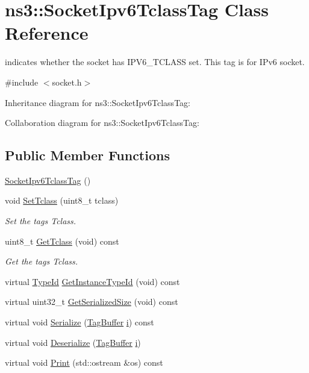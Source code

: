 \hypertarget{classns3_1_1SocketIpv6TclassTag}{}\section{ns3\+:\+:Socket\+Ipv6\+Tclass\+Tag Class Reference}
\label{classns3_1_1SocketIpv6TclassTag}


indicates whether the socket has I\+P\+V6\+\_\+\+T\+C\+L\+A\+SS set. This tag is for I\+Pv6 socket.  




{\ttfamily \#include $<$socket.\+h$>$}



Inheritance diagram for ns3\+:\+:Socket\+Ipv6\+Tclass\+Tag\+:


Collaboration diagram for ns3\+:\+:Socket\+Ipv6\+Tclass\+Tag\+:
\subsection*{Public Member Functions}
\begin{DoxyCompactItemize}
\item 
\hyperlink{classns3_1_1SocketIpv6TclassTag_a9f458d297db00ff2e300641be4d3df49}{Socket\+Ipv6\+Tclass\+Tag} ()
\item 
void \hyperlink{classns3_1_1SocketIpv6TclassTag_aee319e224e59778f2195f7b3819aa40f}{Set\+Tclass} (uint8\+\_\+t tclass)
\begin{DoxyCompactList}\small\item\em Set the tag\textquotesingle{}s Tclass. \end{DoxyCompactList}\item 
uint8\+\_\+t \hyperlink{classns3_1_1SocketIpv6TclassTag_a9392109d0e68356dcfd32ecdc6f39410}{Get\+Tclass} (void) const 
\begin{DoxyCompactList}\small\item\em Get the tag\textquotesingle{}s Tclass. \end{DoxyCompactList}\item 
virtual \hyperlink{classns3_1_1TypeId}{Type\+Id} \hyperlink{classns3_1_1SocketIpv6TclassTag_aaf42438ab8e5e249bd4d89d7692e6a06}{Get\+Instance\+Type\+Id} (void) const 
\item 
virtual uint32\+\_\+t \hyperlink{classns3_1_1SocketIpv6TclassTag_a9b88d4073381212cc016c3e93505f071}{Get\+Serialized\+Size} (void) const 
\item 
virtual void \hyperlink{classns3_1_1SocketIpv6TclassTag_a167b085bce9d64209987757c6adb02fc}{Serialize} (\hyperlink{classns3_1_1TagBuffer}{Tag\+Buffer} \hyperlink{lte__uplink__power__control_8m_a6f6ccfcf58b31cb6412107d9d5281426}{i}) const 
\item 
virtual void \hyperlink{classns3_1_1SocketIpv6TclassTag_a3c2254bd1f1ee201a54e31eba611169f}{Deserialize} (\hyperlink{classns3_1_1TagBuffer}{Tag\+Buffer} \hyperlink{lte__uplink__power__control_8m_a6f6ccfcf58b31cb6412107d9d5281426}{i})
\item 
virtual void \hyperlink{classns3_1_1SocketIpv6TclassTag_a7baf4f2461e046bac34da12c6b3cdc6d}{Print} (std\+::ostream \&os) const 
\end{DoxyCompactItemize}
